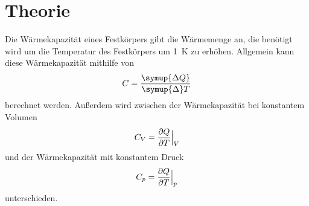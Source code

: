 \section{Theorie}
\label{sec:theorie}

    Die Wärmekapazität eines Festkörpers gibt die Wärmemenge an,
    die benötigt wird um die Temperatur des Festkörpers um \SI{1}{\kelvin} zu erhöhen.
    Allgemein kann diese Wärmekapazität mithilfe von
    \begin{equation*}
        C = \frac{\symup{\Delta Q}}{\symup{\Delta} T}
    \end{equation*}
    berechnet werden.
    Außerdem wird zwischen der Wärmekapazität bei konstantem Volumen
    \begin{equation}
        C_V = \frac{\partial Q}{\partial T} \Bigl|_V
    \end{equation}
    und der Wärmekapazität mit konstantem Druck
    \begin{equation}
        C_p = \frac{\partial Q}{\partial T} \Bigl|_p
    \end{equation}
    unterschieden.
